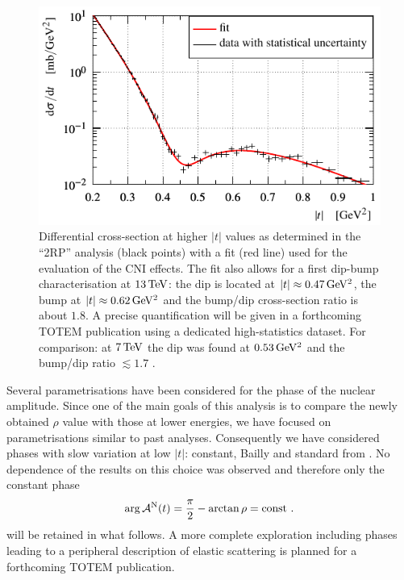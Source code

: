 \begin{figure}
\vskip-5mm
\begin{center}
\includegraphics{fig/high_t_description.pdf}
\caption{%
Differential cross-section at higher $|t|$ values as determined in the ``2RP'' analysis (black points) with a fit (red line) used for the evaluation of the CNI effects. The fit also allows for a first dip-bump characterisation at $13\,{\rm TeV}$: the dip is located at $|t| \approx 0.47\,{\rm GeV^2}$, the bump at $|t|\approx 0.62\,{\rm GeV^2}$ and the bump/dip cross-section ratio is about $1.8$. A precise quantification will be given in a forthcoming TOTEM publication using a dedicated high-statistics dataset. For comparison: at $7\,{\rm TeV}$ the dip was found at $0.53\,{\rm GeV^2}$ and the bump/dip ratio $\lesssim 1.7$ \cite{totem-7tev-first}.
}
\label{fig:high t desc}
\end{center}
\end{figure}

Several parametrisations have been considered for the phase of the nuclear amplitude. Since one of the main goals of this analysis is to compare the newly obtained $\rho$ value with those at lower energies, we have focused on parametrisations similar to past analyses. Consequently we have considered phases with slow variation at low $|t|$: constant, Bailly and standard from \cite{totem-8tev-1km}. No dependence of the results on this choice was observed and therefore only the constant phase
\begin{equation}
\label{eq:nuc phase con}
\arg {\cal A}^{\rm N}(t) = {\pi\over 2} - \arctan\rho = \hbox{const} \ .
\end{equation}
will be retained in what follows. A more complete exploration including phases leading to a peripheral description of elastic scattering is planned for a forthcoming TOTEM publication.

